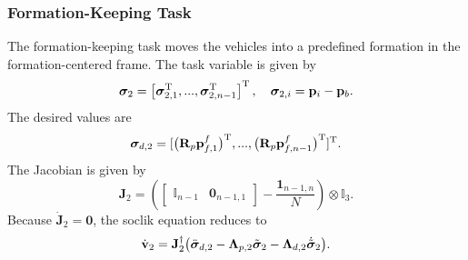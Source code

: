 \subsubsection{Formation-Keeping Task}
The formation-keeping task moves the vehicles into a predefined formation in the formation-centered frame. The task variable is given by
\begin{equation}
    \bm{\sigma}_2 = \left[ \bm{\sigma}_{2,1}^{\mathrm{T}}, ..., \bm{\sigma}_{2,n-1}^{\mathrm{T}}\right]^{\mathrm{T}}, \quad \bm{\sigma}_{2,i}  = \mathbf{p}_i - \mathbf{p}_b.
\end{equation}
The desired values are
\begin{equation}
    \bm{\sigma}_{d,2} = [\bigl(\mathbf{R}_p \mathbf{p}_{f,1}^f\bigr)^{\mathrm{T}}, ..., \bigl(\mathbf{R}_p \mathbf{p}_{f,n-1}^f\bigr) ^{\mathrm{T}}] ^{\mathrm{T}}.
\end{equation}
The Jacobian is given by 
\begin{equation}
    \mathbf{J}_2 = \left(\begin{bmatrix}
        \mathbb{I}_{n-1} & \mathbf{0}_{n-1, 1}
    \end{bmatrix} - \frac{\mathbf{1}_{n-1, n}}{N}\right)\otimes \mathbb{I}_3.
\end{equation}
Because $\dot{\mathbf{J}}_2 = \mathbf{0}$, the \gls{soclik} equation reduces to
\begin{equation}\label{eq:formation_keeping_controller}
    \dot{\mathbf{v}}_2 = \mathbf{J}_2^\dagger \bigl(\ddot{\bm{\sigma}}_{d,2} - \mathbf{\Lambda}_{p,2}\Tilde{\bm{\sigma}}_2 - \mathbf{\Lambda}_{d,2} \dot{\Tilde{\bm{\sigma}}}_2\bigr).
\end{equation}

